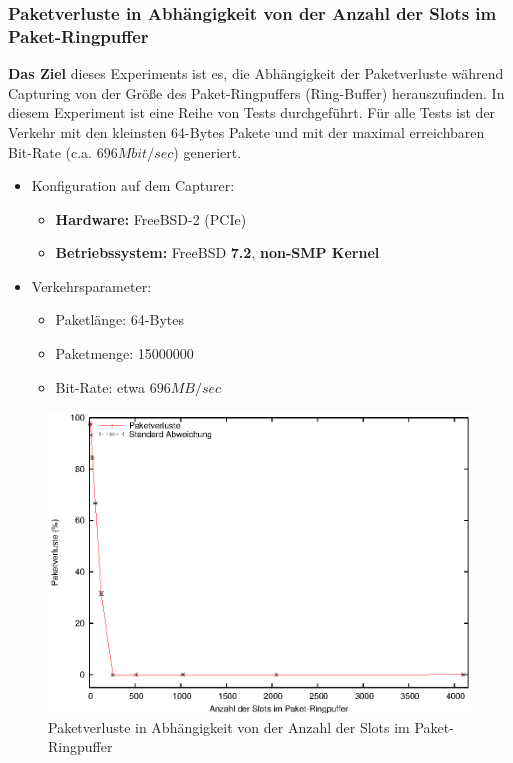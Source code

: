 \subsubsection*{Paketverluste in Abhängigkeit von der Anzahl der Slots im  Paket-Ringpuffer}
\textbf{Das Ziel} dieses Experiments ist es, die Abhängigkeit der Paketverluste
während Capturing von der Größe des Paket-Ringpuffers (Ring-Buffer)
herauszufinden. In diesem Experiment ist eine Reihe von Tests durchgeführt. Für
alle Tests ist der Verkehr mit den kleinsten 64-Bytes Pakete und mit der maximal
erreichbaren Bit-Rate (c.a. $696Mbit/sec$) generiert.
%
\begin{itemize}
\item Konfiguration auf dem Capturer: 
\begin{itemize}
	\item \textbf{Hardware:} FreeBSD-2 (PCIe)
	\item \textbf{Betriebssystem:} FreeBSD \textbf{7.2}, \textbf{non-SMP Kernel}
\end{itemize}
\item Verkehrsparameter:
\begin{itemize}
	\item Paketlänge: 64-Bytes
	\item Paketmenge: 15000000
	\item Bit-Rate: etwa $696MB/sec$
\end{itemize}
\end{itemize}
\begin{figure} 
\centering \includegraphics[width=5.5in]{plots/graphs/pktlos_single_bufsize.eps}
\caption{Paketverluste in Abhängigkeit von der Anzahl der Slots im Paket-Ringpuffer}
\label{img:plot_pktlos_puffs}
\end{figure}
%
% 
